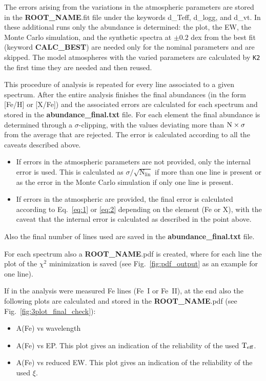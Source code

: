 \documentclass[modern]{aastex701}
\begin{document}
The errors arising from the variations in the atmospheric parameters are stored in the {\bf ROOT\_NAME}.fit file under the keywords d\_Teff, d\_logg, and d\_vt. In these additional runs only the abundance is determined: the plot, the EW, the Monte Carlo simulation, and the synthetic spectra at $\pm 0.2$ dex from the best fit (keyword {\bf CALC\_BEST}) are needed only for the nominal parameters and are skipped. The model atmospheres with the varied parameters are calculated by \texttt{K2} the first time they are needed and then reused. 

This procedure of analysis is repeated for every line associated to a given spectrum. After the entire analysis finishes the final abundances (in the form [Fe/H] or [X/Fe]) and the associated errors are calculated for each spectrum and stored in the {\bf abundance\_final.txt} file. For each element the final abundance is determined through a $\sigma$-clipping, with the values deviating more than $\rm N\times\sigma$ from the average that are rejected. The error is calculated according to all the caveats described above. 
\begin{itemize}
    \item If errors in the atmospheric parameters are not provided, only the internal error is used. This is calculated as  $\sigma / \sqrt{\mathrm{N_{lin}}}$ if more than one line is present or as the error in the Monte Carlo simulation if only one line is present.
    \item If errors in the atmospheric are provided, the final error is calculated according to Eq.~\ref{eq:1} or \ref{eq:2} depending on the element (Fe or X), with the caveat that the internal error is calculated as described in the point above. 
\end{itemize}

Also the final number of lines used are saved in the {\bf abundance\_final.txt} file. 

For each spectrum also a {\bf ROOT\_NAME}.pdf is created, where for each line the plot of the $\chi^2$ minimization is saved (see Fig.~\ref{fig:pdf_output} as an example for one line). 

If in the analysis were measured Fe lines (Fe~I or Fe~II), at the end also the following plots are calculated and stored in the {\bf ROOT\_NAME}.pdf (see Fig.~\ref{fig:3plot_final_check}): 
\begin{itemize}
    \item A(Fe) vs wavelength
    \item A(Fe) vs EP. This plot gives an indication of the reliability of the used $\rm T_{eff}$. 
    \item A(Fe) vs reduced EW. This plot gives an indication of the reliability of the used $\xi$. 
\end{itemize}
\end{document}
